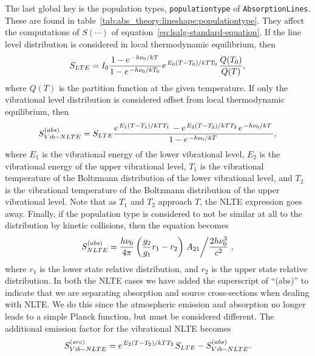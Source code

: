 The last global key is the population types, \verb|populationtype| of \verb|AbsorptionLines|.
These are found in table~\ref{tab:abs_theory:lineshape:populationtype}.
They affect the computations of $S(\cdots)$ of equation~\ref{eq:lsalg-standard-equation}.
If the line level distribution is considered in local thermodynamic equilibrium, then
\begin{equation}
 S_{LTE} = I_0\frac{1 - e^{\left. -h\nu_0 \middle/ kT\right.}}{1 - e^{\left. -h\nu_0 \middle/ kT_0\right.}}e^{\left.{E_0 (T - T_0)}\middle/{kTT_0}\right.}\frac{Q(T_0)}{Q(T)},
 \label{eq:linestrength:calc}
\end{equation}
where $Q(T)$ is the partition function at the given temperature.
If only the vibrational level distribution is considered offset from local thermodynamic equilibrium, then
\begin{equation}
 S^{(abs)}_{Vib-NLTE} = S_{LTE} \frac{e^{\left.{E_1 (T - T_1)}\middle/{kTT_1}\right.} - e^{\left.{E_2 (T - T_2)}\middle/{kTT_2}\right.}e^{\left. -h\nu_0 \middle/ kT\right.}}{1 - e^{\left. -h\nu_0 \middle/ kT\right.}},
\end{equation}
where
$E_1$ is the vibrational energy of the lower vibrational level,
$E_2$ is the vibrational energy of the upper vibrational level,
$T_1$ is the vibrational temperature of the Boltzmann distribution of the lower vibrational level, and
$T_2$ is the vibrational temperature of the Boltzmann distribution of the upper vibrational level.
Note that as $T_1$ and $T_2$ approach $T$, the NLTE expression goes away.
Finally, if the population type is considered to not be similar at all to the distribution by kinetic collisions,
then the equation becomes
\begin{equation}
  S^{(abs)}_{NLTE} = \frac{h\nu_0}{4\pi}\left(\frac{g_2}{g_1} r_1 - r_2\right) \left.A_{21}\middle/\frac{2h\nu_0^3}{c^2}\right.,
\end{equation}
where
$r_1$ is the lower state relative distribution, and 
$r_2$ is the upper state relative distribution.
In both the NLTE cases we have added the superscript of ``(abs)'' to indicate that we 
are separating absorption and source cross-sections when dealing with NLTE.
We do this since the atmospheric emission and absorption no longer leads to a simple Planck function, but must be considered different.
The additional emission factor for the vibrational NLTE becomes
\begin{equation}
 S^{(src)}_{Vib-NLTE} = e^{\left.{E_2 (T - T_2)}\middle/{kTT_2}\right.}S_{LTE} - S^{(abs)}_{Vib-NLTE}.
\end{equation}
